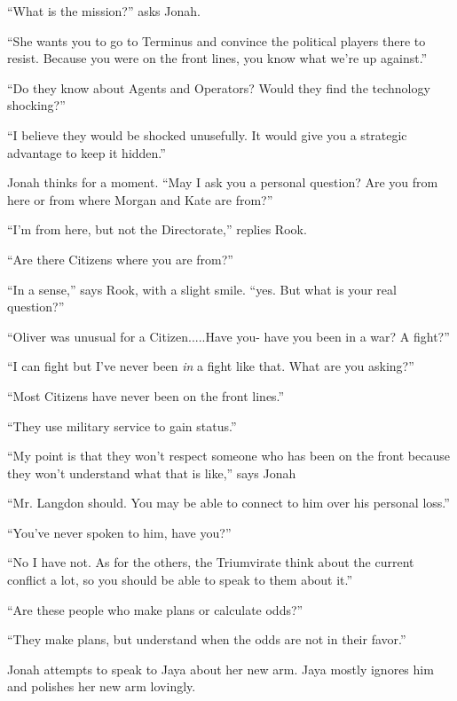 ``What is the mission?'' asks Jonah.

``She wants you to go to Terminus and convince the political players there to resist. Because you were on the front lines, you know what we're up against.''

``Do they know about Agents and Operators?  Would they find the technology shocking?''

``I believe they would be shocked unusefully.  It would give you a strategic advantage to keep it hidden.''

Jonah thinks for a moment.  ``May I ask you a personal question?  Are you from here or from where Morgan and Kate are from?''

``I'm from here, but not the Directorate,'' replies Rook.

``Are there Citizens where you are from?''

``In a sense,'' says Rook, with a slight smile. ``yes.  But what is your real question?''

``Oliver was unusual for a Citizen.....Have you- have you been in a war?  A fight?''

``I can fight but I've never been \textit{in} a fight like that.  What are you asking?''

``Most Citizens have never been on the front lines.''

``They use military service to gain status.''

``My point is that they won't respect someone who has been on the front because they won't understand what that is like,'' says Jonah

``Mr. Langdon should.  You may be able to connect to him over his personal loss.''

``You've never spoken to him, have you?''

``No I have not.  As for the others, the Triumvirate think about the current conflict a lot, so you should be able to speak to them about it.''

``Are these people who make plans or calculate odds?''

``They make plans, but understand when the odds are not in their favor.''





Jonah attempts to speak to Jaya about her new arm.  Jaya mostly ignores him and polishes her new arm lovingly.





